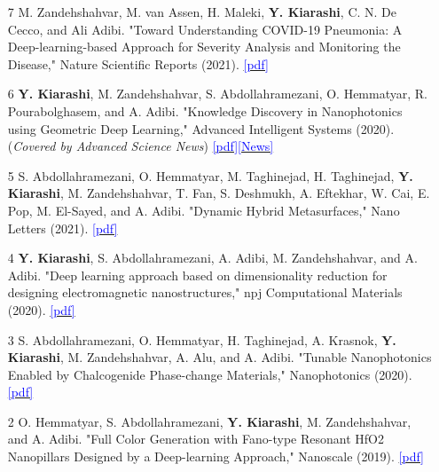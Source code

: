\documentclass[margin, line]{res}
\newenvironment{list1}{
  \begin{list}{\ding{113}}{%
      \setlength{\itemsep}{0in}
      \setlength{\parsep}{0in} \setlength{\parskip}{0in}
      \setlength{\topsep}{0in} \setlength{\partopsep}{0in} 
      \setlength{\leftmargin}{0.17in}}}{\end{list}}
\begin{document}
\begin{resume}
\begin{list1}
\begin{itemize}
    \item [7] M. Zandehshahvar, M. van Assen, H. Maleki, \textbf{Y. Kiarashi}, C. N. De Cecco, and Ali Adibi. "Toward Understanding COVID-19 Pneumonia: A Deep-learning-based Approach for Severity Analysis and Monitoring the Disease," Nature Scientific Reports (2021). \href{https://www.nature.com/articles/s41598-021-90411-3}{\textcolor{blue}{[pdf]}}
    
    
    \item [6] \textbf{Y. Kiarashi}, M. Zandehshahvar, S. Abdollahramezani, O. Hemmatyar, R. Pourabolghasem, and A. Adibi. "Knowledge Discovery in Nanophotonics using Geometric Deep Learning," Advanced Intelligent Systems (2020). (\textit{Covered by Advanced Science News}) \href{https://onlinelibrary.wiley.com/doi/pdf/10.1002/aisy.201900132}{\textcolor{blue}{[pdf]}}\href{https://www.advancedsciencenews.com/can-ai-solve-the-mysteries-of-photonic-nanostructures/}{\textcolor{blue}{[News]}}
    
    \item [5] S. Abdollahramezani, O. Hemmatyar, M. Taghinejad, H. Taghinejad, \textbf{Y. Kiarashi}, M. Zandehshahvar, T. Fan, S. Deshmukh, A. Eftekhar, W. Cai, E. Pop, M. El-Sayed, and A. Adibi. "Dynamic Hybrid Metasurfaces," Nano Letters (2021). \href{https://pubs.acs.org/doi/full/10.1021/acs.nanolett.0c03625}{\textcolor{blue}{[pdf]}}
    
    \item [4] \textbf{Y. Kiarashi}, S. Abdollahramezani, A. Adibi, M. Zandehshahvar, and A. Adibi. "Deep learning approach based on dimensionality reduction for designing electromagnetic nanostructures," npj Computational Materials (2020). 
    \href{https://www.nature.com/articles/s41524-020-0276-y}{\textcolor{blue}{[pdf]}}
    
    \item [3] S. Abdollahramezani, O. Hemmatyar, H. Taghinejad, A. Krasnok, \textbf{Y. Kiarashi}, M. Zandehshahvar, A. Alu, and A. Adibi. "Tunable Nanophotonics Enabled by Chalcogenide Phase-change Materials," Nanophotonics (2020). \href{https://www.degruyter.com/view/journals/nanoph/9/5/article-p1189.xml}{\textcolor{blue}{[pdf]}}

        
    \item [2] O. Hemmatyar, S. Abdollahramezani, \textbf{Y. Kiarashi}, M. Zandehshahvar, and A. Adibi. "Full Color Generation with Fano-type Resonant HfO2 Nanopillars Designed by a Deep-learning Approach," Nanoscale (2019). \href{https://arxiv.org/pdf/1907.01595}{\textcolor{blue}{[pdf]}}
    

\end{itemize}
\end{list1}
\end{resume}
\end{document}

